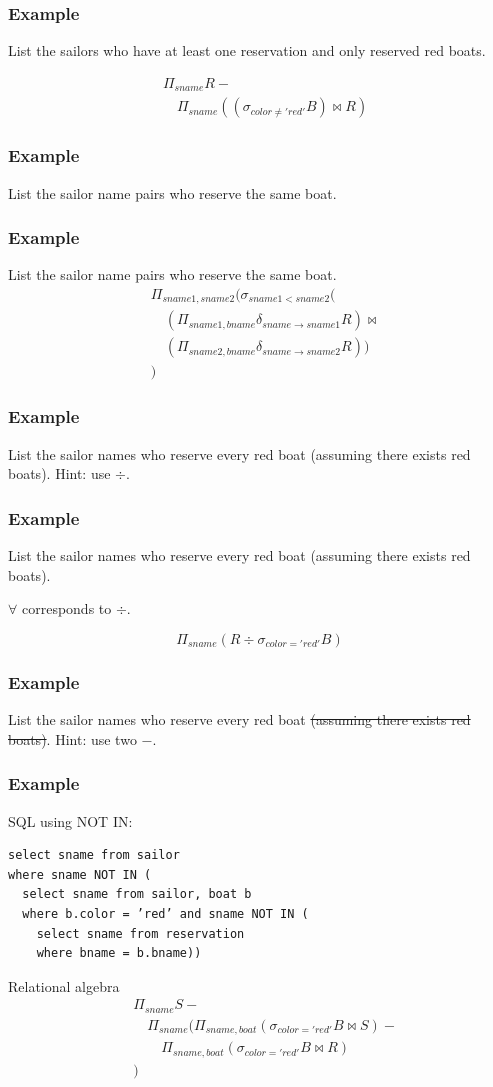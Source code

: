 \documentclass{beamer}
\begin{document}
\begin{frame}
\frametitle{Example}
List the sailors who have at least one reservation and only reserved red boats.  

\begin{align*}
& \Pi_{sname} R - \\
& \quad \Pi_{sname} ((\sigma_{color\neq 'red'} B) \bowtie R)
\end{align*}


\end{frame}

\begin{frame}
\frametitle{Example}
List the sailor name pairs who reserve the same boat. 
\end{frame}

\begin{frame}
\frametitle{Example}
List the sailor name pairs who reserve the same boat. 
\begin{align*}
& \Pi_{sname1, sname2} (\sigma_{sname1<sname2 }( \\
&\quad (\Pi_{sname1, bname} \delta_{sname \rightarrow sname1}R)\bowtie \\
&\quad (\Pi_{sname2, bname} \delta_{sname \rightarrow sname2}R))\\
&)
\end{align*}
\end{frame}

\begin{frame}
\frametitle{Example}
List the sailor names who reserve every red boat (assuming there exists red boats). Hint: use $\div$. 
\end{frame}

\begin{frame}
\frametitle{Example}
List the sailor names who reserve every red boat (assuming there exists red boats).

$\forall$ corresponds to $\div$.


$$
\Pi_{sname} (R\div \sigma_{color='red'} B)
$$
\end{frame}


\begin{frame}
\frametitle{Example}
List the sailor names who reserve every red boat \st{(assuming there exists red boats)}.
Hint: use two $-$. 
\end{frame}

\begin{frame}[fragile]
\frametitle{Example}
SQL using NOT IN:
\begin{verbatim}
select sname from sailor
where sname NOT IN (
  select sname from sailor, boat b 
  where b.color = ’red’ and sname NOT IN (
    select sname from reservation
    where bname = b.bname))
\end{verbatim}
Relational algebra
\begin{align*}
& \Pi_{sname} S - \\
& \quad \Pi_{sname}(\Pi_{sname, boat}(\sigma_{color='red'} B \bowtie S)-\\
& \quad\quad \Pi_{sname, boat} (\sigma_{color='red'} B \bowtie R)\\
&)
\end{align*}
\end{frame}
\end{document}
